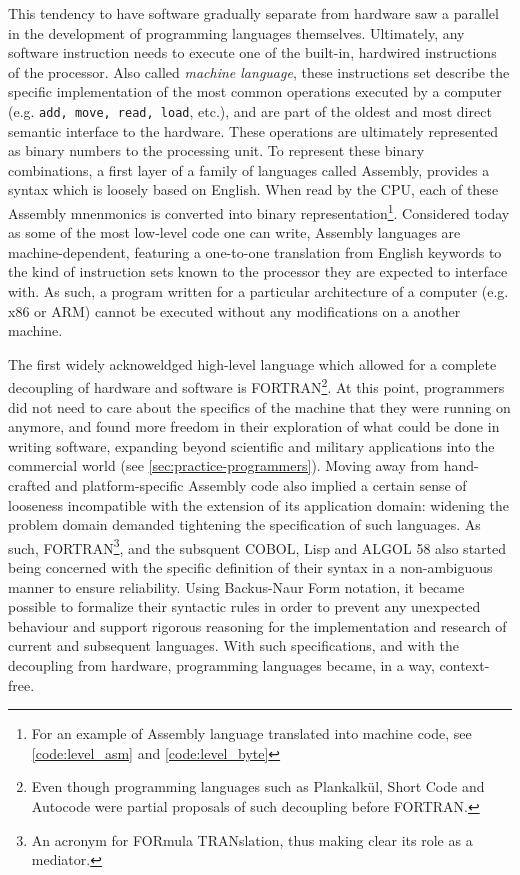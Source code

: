 This tendency to have software gradually separate from hardware saw a parallel in the development of programming languages themselves. Ultimately, any software instruction needs to execute one of the built-in, hardwired instructions of the processor. Also called \emph{machine language}, these instructions set describe the specific implementation of the most common operations executed by a computer (e.g. \lstinline{add, move, read, load}, etc.), and are part of the oldest and most direct semantic interface to the hardware. These operations are ultimately represented as binary numbers to the processing unit. To represent these binary combinations, a first layer of a family of languages called Assembly, provides a syntax which is loosely based on English. When read by the CPU, each of these Assembly mnenmonics is converted into binary representation\footnote{For an example of Assembly language translated into machine code, see \ref{code:level_asm} and \ref{code:level_byte}}. Considered today as some of the most low-level code one can write, Assembly languages are machine-dependent, featuring a one-to-one translation from English keywords to the kind of instruction sets known to the processor they are expected to interface with. As such, a program written for a particular architecture of a computer (e.g. x86 or ARM) cannot be executed without any modifications on a another machine.

The first widely acknoweldged high-level language which allowed for a complete decoupling of hardware and software is FORTRAN\footnote{Even though programming languages such as Plankalkül, Short Code and Autocode were partial proposals of such decoupling before FORTRAN.}. At this point, programmers did not need to care about the specifics of the machine that they were running on anymore, and found more freedom in their exploration of what could be done in writing software, expanding beyond scientific and military applications into the commercial world (see \ref{sec:practice-programmers}). Moving away from hand-crafted and platform-specific Assembly code also implied a certain sense of looseness incompatible with the extension of its application domain: widening the problem domain demanded tightening the specification of such languages. As such, FORTRAN\footnote{An acronym for FORmula TRANslation, thus making clear its role as a mediator.}, and the subsquent COBOL, Lisp and ALGOL 58 also started being concerned with the specific definition of their syntax in a non-ambiguous manner to ensure reliability. Using Backus-Naur Form notation, it became possible to formalize their syntactic rules in order to prevent any unexpected behaviour and support rigorous reasoning for the implementation and research of current and subsequent languages. With such specifications, and with the decoupling from hardware, programming languages became, in a way, context-free.

